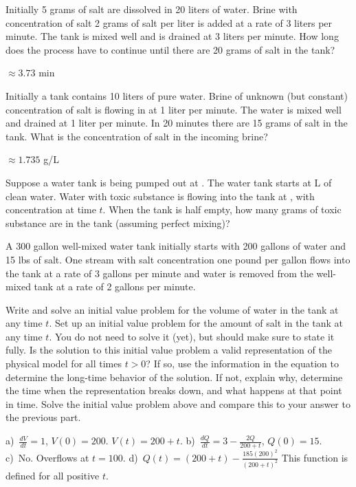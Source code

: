 \begin{exercise}
Initially 5 grams of salt are dissolved in 20 liters of water.  Brine
with concentration of salt 2 grams of salt per liter is added at a rate
of 3 liters per minute.  The tank is mixed well and is drained at 3 liters
per minute.  How long does the process have to continue until there are 20 grams
of salt in the tank?
\end{exercise}
\comboSol{%
}
{%
$\approx 3.73$ min
}

\begin{exercise}
Initially a tank contains 10 liters of pure water.
Brine of unknown (but constant) concentration
of salt is flowing in at 1 liter per minute.
The water is mixed well and drained at 1 liter per minute.
In 20 minutes there are 15 grams of salt in the tank.  What is the
concentration of salt in the incoming brine?
\end{exercise}
\comboSol{%
}
{%
$\approx 1.735$ g/L
}

\begin{exercise}\ansMark%
Suppose a water tank is being pumped out at .  The
water tank starts at \unit[10]{L} of clean water.
Water with
toxic substance is flowing into the tank at ,
with concentration  at time $t$.
When the tank is half empty, how many grams of toxic substance are in the
tank (assuming perfect mixing)?
\end{exercise}

\begin{exercise}
A 300 gallon well-mixed water tank initially starts with 200 gallons of water and 15 lbs of salt. One stream with salt concentration one pound per gallon flows into the tank at a rate of 3 gallons per minute and water is removed from the well-mixed tank at a rate of 2 gallons per minute.
\begin{tasks}
\task Write and solve an initial value problem for the volume of water in the tank at any time $t$.
\task Set up an initial value problem for the amount of salt in the tank at any time $t$. You do not need to solve it (yet), but should make sure to state it fully.
\task Is the solution to this initial value problem a valid representation of the physical model for all times $t > 0$? If so, use the information in the equation to determine the long-time behavior of the solution. If not, explain why, determine the time when the representation breaks down, and what happens at that point in time.
\task Solve the initial value problem above and compare this to your answer to the previous part.
\end{tasks}
\end{exercise}
\comboSol{%
}
{%
a)~$\frac{dV}{dt} = 1$, $V(0) = 200$. $V(t) = 200+t$. \quad
b)~$\frac{dQ}{dt} = 3 - \frac{2Q}{200+t}$, $Q(0) = 15$. \quad
c)~No. Overflows at $t=100$. \quad
d)~$Q(t) = (200+t) - \frac{185(200)^2}{(200+t)^2}$ This function is defined for all positive $t$.
}

